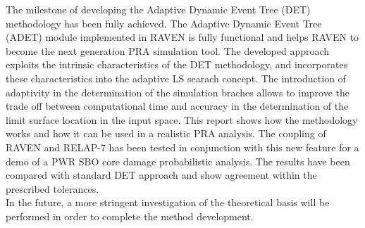 \label{sec:conclusions}
The milestone of developing the Adaptive Dynamic Event Tree (DET) methodology has been fully achieved. The Adaptive Dynamic Event Tree (ADET) module implemented in RAVEN is fully functional and helps RAVEN to become the next generation PRA simulation tool. The developed approach exploits the intrinsic characteristics of the DET methodology, and incorporates these characteristics into the adaptive LS searach concept. The introduction of adaptivity in the determination of the simulation braches allows to improve the trade off between computational time and accuracy in the determination of the limit surface location in the input space. This report shows how the methodology works and how it can be used in a realistic PRA analysis. The coupling of RAVEN and RELAP-7 has been tested in conjunction with this new feature for a demo of a PWR SBO core damage probabilistic analysis. The results have been compared with standard DET approach and show agreement within the prescribed tolerances.
\\In the future, a more stringent investigation of the theoretical basis will be performed in order to complete the method development.

